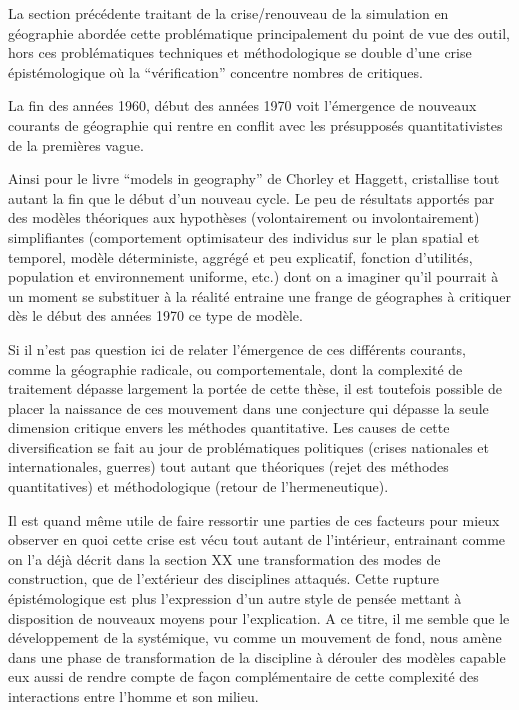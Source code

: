 La section précédente traitant de la crise/renouveau de la simulation en géographie abordée cette problématique principalement du point de vue des outil, hors ces problématiques techniques et méthodologique se double d'une crise épistémologique où la \enquote{vérification} concentre nombres de critiques. 

La fin des années 1960, début des années 1970 voit l'émergence de nouveaux courants de géographie qui rentre en conflit avec les présupposés quantitativistes de la premières vague.

Ainsi pour \textcite{Golledge2006} le livre \foreignquote{english}{models in geography} de Chorley et Haggett,  cristallise tout autant la fin que le début d'un nouveau cycle. Le peu de résultats apportés par des modèles théoriques aux hypothèses (volontairement ou involontairement) simplifiantes (comportement optimisateur des individus sur le plan spatial et temporel, modèle déterministe, aggrégé et peu explicatif, fonction d'utilités, population et environnement uniforme, etc.) dont on a imaginer qu'il pourrait à un moment se substituer à la réalité entraine une frange de géographes à critiquer dès le début des années 1970 ce type de modèle.

Si il n'est pas question ici de relater l'émergence de ces différents courants, comme la géographie radicale, ou comportementale, dont la complexité de traitement dépasse largement la portée de cette thèse, il est toutefois possible de placer la naissance de ces mouvement dans une conjecture qui dépasse la seule dimension critique envers les méthodes quantitative. Les causes de cette diversification se fait au jour de problématiques politiques (crises nationales et internationales, guerres) tout autant que théoriques (rejet des méthodes quantitatives) et méthodologique (retour de l'hermeneutique).

Il est quand même utile de faire ressortir une parties de ces facteurs pour mieux observer en quoi cette crise est vécu tout autant de l'intérieur, entrainant comme on l'a déjà décrit dans la section XX une transformation des modes de construction, que de l'extérieur des disciplines attaqués. Cette rupture épistémologique est plus l'expression d'un autre style de pensée mettant à disposition de nouveaux moyens pour l'explication. A ce titre, il me semble que le développement de la systémique, vu comme un mouvement de fond, nous amène dans une phase de transformation de la discipline à dérouler des modèles capable eux aussi de rendre compte de façon complémentaire de cette complexité des interactions entre l'homme et son milieu. 

